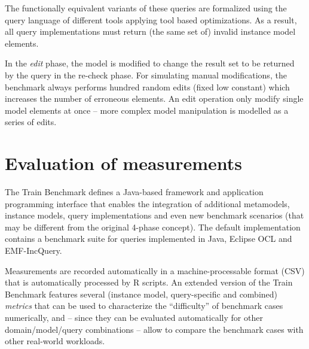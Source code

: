 The functionally equivalent variants of these queries are formalized using the
query language of different tools applying tool based optimizations. As a
result, all query implementations must return (the same set of) invalid instance
model elements.
 
In the \emph{edit} phase, the model is modified to change the result set to be
returned by the query in the re-check phase. For simulating manual
modifications, the benchmark always performs hundred random edits (fixed low
constant) which increases the number of erroneous elements. An edit operation
only modify single model elements at once -- more complex model manipulation is
modelled as a series of edits.

\section{Evaluation of measurements}
The Train Benchmark defines a Java-based framework and application programming
interface that enables the integration of additional metamodels, instance
models, query implementations and even new benchmark scenarios (that may be
different from the original 4-phase concept). The default implementation
contains a benchmark suite for queries implemented in Java, Eclipse OCL and
EMF-IncQuery.

Measurements are recorded automatically in a machine-processable format (CSV)
that is automatically processed by R \cite{TB:R} scripts. An extended version of the Train
Benchmark \cite{TB:ASE2013} features several (instance model, query-specific and
combined) \emph{metrics} that can be used to characterize the ``difficulty'' of
benchmark cases numerically, and -- since they can be evaluated automatically
for other domain/model/query combinations -- allow to compare the benchmark
cases with other real-world workloads.
